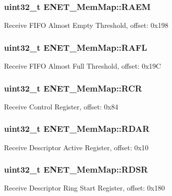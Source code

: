 \subsubsection[{R\+A\+E\+M}]{\setlength{\rightskip}{0pt plus 5cm}uint32\+\_\+t E\+N\+E\+T\+\_\+\+Mem\+Map\+::\+R\+A\+E\+M}\label{struct_e_n_e_t___mem_map_a0cb46a60ee6f66278066bd85b782756c}
Receive F\+I\+F\+O Almost Empty Threshold, offset\+: 0x198 \hypertarget{struct_e_n_e_t___mem_map_a52027d938a843a1f4c58808e15ad7a39}{}
\subsubsection[{R\+A\+F\+L}]{\setlength{\rightskip}{0pt plus 5cm}uint32\+\_\+t E\+N\+E\+T\+\_\+\+Mem\+Map\+::\+R\+A\+F\+L}\label{struct_e_n_e_t___mem_map_a52027d938a843a1f4c58808e15ad7a39}
Receive F\+I\+F\+O Almost Full Threshold, offset\+: 0x19\+C \hypertarget{struct_e_n_e_t___mem_map_a407f506f97473861cf0d5ef5a4649c02}{}
\subsubsection[{R\+C\+R}]{\setlength{\rightskip}{0pt plus 5cm}uint32\+\_\+t E\+N\+E\+T\+\_\+\+Mem\+Map\+::\+R\+C\+R}\label{struct_e_n_e_t___mem_map_a407f506f97473861cf0d5ef5a4649c02}
Receive Control Register, offset\+: 0x84 \hypertarget{struct_e_n_e_t___mem_map_ac81db3c26b1cda460f57d07a6ec530e8}{}
\subsubsection[{R\+D\+A\+R}]{\setlength{\rightskip}{0pt plus 5cm}uint32\+\_\+t E\+N\+E\+T\+\_\+\+Mem\+Map\+::\+R\+D\+A\+R}\label{struct_e_n_e_t___mem_map_ac81db3c26b1cda460f57d07a6ec530e8}
Receive Descriptor Active Register, offset\+: 0x10 \hypertarget{struct_e_n_e_t___mem_map_a67a90891a4f2cf259db5e9b95b100d60}{}
\subsubsection[{R\+D\+S\+R}]{\setlength{\rightskip}{0pt plus 5cm}uint32\+\_\+t E\+N\+E\+T\+\_\+\+Mem\+Map\+::\+R\+D\+S\+R}\label{struct_e_n_e_t___mem_map_a67a90891a4f2cf259db5e9b95b100d60}
Receive Descriptor Ring Start Register, offset\+: 0x180 \hypertarget{struct_e_n_e_t___mem_map_a3b1e0279007d57c1cfed8081face0169}{}
